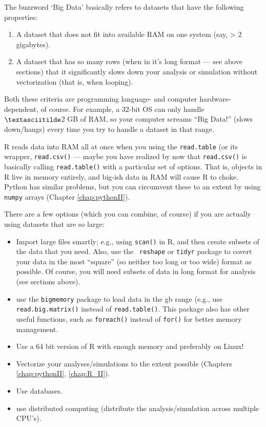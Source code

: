 The  buzzword `Big Data' basically refers to datasets that have the 
following properties:
\begin{enumerate}

\item A dataset that does not fit into available RAM on one system 
(say, > 2 gigabytes). 
\item A dataset that has so many rows (when in it's long format --- see 
above sections) that it significantly slows down your analysis or 
simulation without vectorization (that is, when looping).	
\end{enumerate} 

Both these criteria are programming language- and computer 
hardware-dependent, of course. For example, a 32-bit OS can only handle 
$\textasciitilde$2 GB of RAM, so your computer screams ``Big Data!'' (slows down/hangs) 
every time you try to handle a dataset in that range. 

R reads data into RAM all at once when you using the {\tt read.table} 
(or its wrapper, {\tt read.csv()} --- maybe you have realized by now 
that {\tt read.csv()} is basically calling {\tt read.table()} with a 
particular set of options. That is, objects in R live in memory 
entirely, and big-ish data in RAM will cause R to choke. Python has 
similar problems, but you can circumvent these to an extent by using 
{\tt numpy} arrays (Chapter \ref{chap:pythonII}).

There are a few options (which you can combine, of course) if you 
are actually using datasets that are so large:

\begin{itemize}
	\item Import large files smartly; e.g., using {\tt scan()} in R, and 
	then create subsets of the data that you need. Also, use the {\tt 
	reshape} or {\tt tidyr} package to covert your data in the most 
	``square'' (so neither too long or too wide) format as possible. Of 
	course, you will need subsets of data in long format for analysis 
	(see sections above).
	\item use the {\tt bigmemory} package to load data in the gb range (e.g., use 
	{\tt read.big.matrix()} instead of {\tt read.table()}. This package 
	also has other useful functions, such as {\tt foreach()} instead of 
	{\tt for()} for better memory management. 
	\item Use a 64 bit version of R with enough memory and preferably on 
	Linux!
	\item Vectorize your analyses/simulations to the extent possible 
	(Chapters \ref{chap:pythonII}, \ref{chap:R_II}). 
	\item Use databases.
	\item use distributed computing (distribute the analysis/simulation 
	across multiple CPU's).
\end{itemize}
 
